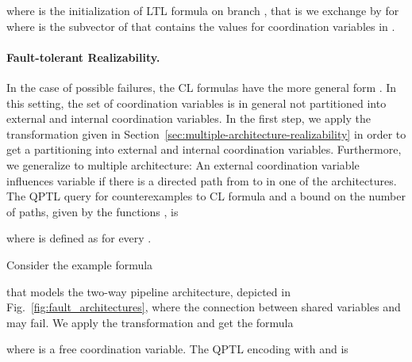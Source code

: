 \documentclass{LMCS}
\theoremstyle{plain}\newtheorem{theorem}[thm]{Theorem}
\theoremstyle{plain}\newtheorem{lemma}[thm]{Lemma}
\theoremstyle{plain}\newtheorem{proposition}[thm]{Proposition}
\theoremstyle{plain}\newtheorem{corollary}[thm]{Corollary}
\theoremstyle{definition}\newtheorem{definition}{Definition}[section]
\begin{document}
where  is the initialization of LTL formula  on branch , that is we exchange  by  for  where  is the subvector of  that contains the values for coordination variables in .

\paragraph{\bf Fault-tolerant Realizability.} 
\label{sec:realizability_node_failures}


In the case of possible failures, the CL formulas  have the more general form .
In this setting, the set of coordination variables  is in general not partitioned into external and internal coordination variables.
In the first step, we apply the transformation  given in Section~\ref{sec:multiple-architecture-realizability} in order to get a partitioning into external and internal coordination variables.
Furthermore, we generalize  to multiple architecture: An external coordination variable  influences variable  if there is a directed path from  to  in one of the architectures.
The QPTL query for counterexamples to CL formula  and a bound on the number of paths, given by the functions , is

where  is defined as  for every .

Consider the example formula

that models the two-way pipeline architecture, depicted in Fig.~\ref{fig:fault_architectures}, where the connection between shared variables  and  may fail.
We apply the transformation  and get the formula

where  is a free coordination variable.
The QPTL encoding  with  and  is 
\end{document}
